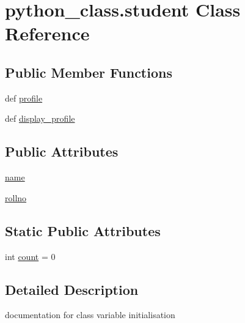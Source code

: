\hypertarget{classpython__class_1_1student}{\section{python\-\_\-class.\-student Class Reference}
\label{classpython__class_1_1student}
}
\subsection*{Public Member Functions}
\begin{DoxyCompactItemize}
\item 
def \hyperlink{classpython__class_1_1student_a1588a3234c85c1c1a0c816643662aa01}{profile}
\item 
def \hyperlink{classpython__class_1_1student_aaffa12881cd226b7d55c419dc3a4eca3}{display\-\_\-profile}
\end{DoxyCompactItemize}
\subsection*{Public Attributes}
\begin{DoxyCompactItemize}
\item 
\hyperlink{classpython__class_1_1student_a473a4ab52914d49597c66da2e05ba913}{name}
\item 
\hyperlink{classpython__class_1_1student_a62d711e507331eca1d07fd2dce3a327d}{rollno}
\end{DoxyCompactItemize}
\subsection*{Static Public Attributes}
\begin{DoxyCompactItemize}
\item 
int \hyperlink{classpython__class_1_1student_a2db4ae87725425fb6fa3711bf212e636}{count} = 0
\end{DoxyCompactItemize}


\subsection{Detailed Description}
\begin{DoxyVerb}documentation for class
variable initialisation\end{DoxyVerb}
 

